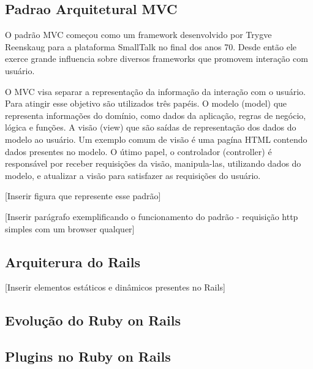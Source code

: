 
\subsection{Padrao Arquitetural MVC}

O padrão MVC começou como um framework desenvolvido por Trygve Reenskaug para a plataforma SmallTalk no final dos anos 70. Desde então ele exerce grande influencia sobre diversos frameworks que promovem interação com usuário.

O MVC visa separar a representação da informação da interação com o usuário. Para atingir esse objetivo são utilizados três papéis. O modelo (model) que representa informações do domínio, como dados da aplicação, regras de negócio, lógica e funções. A visão (view) que são saídas de representação dos dados do modelo ao usuário. Um exemplo comum de visão é uma pagína HTML contendo dados presentes no modelo. O útimo papel, o controlador (controller) é responsável por receber requisições da visão, manipula-las, utilizando dados do modelo, e atualizar a visão para satisfazer as requisições do usuário.

[Inserir figura que represente esse padrão]

[Inserir parágrafo exemplificando o funcionamento do padrão - requisição http simples com um browser qualquer]


\subsection{Arquiterura do Rails}

[Inserir elementos estáticos e dinâmicos presentes no Rails]


\subsection{Evolução do Ruby on Rails}



\subsection{Plugins no Ruby on Rails}